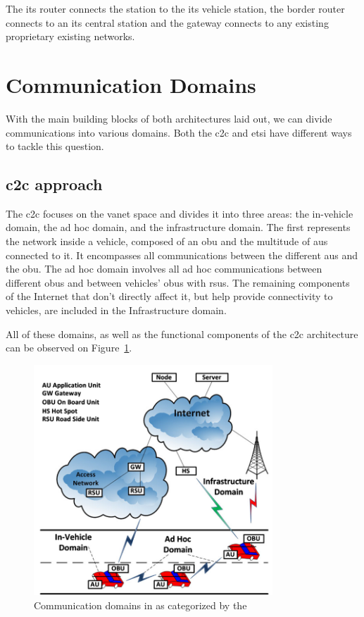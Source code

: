 \begin{enumerate}
The \gls{its} router connects the station to the \gls{its} vehicle station, the border router connects to an \gls{its} central station and the gateway connects to any existing proprietary existing networks.

\end{enumerate}


\section{Communication Domains}
\label{sec:VANET_communication_domains}

With the main building blocks of both architectures laid out, we can divide communications into various domains. Both the \gls{c2c} and \gls{etsi} have different ways to tackle this question.

\subsection[C2C approach]{\gls{c2c} approach}
The \gls{c2c} focuses on the \gls{vanet} space and divides it into three areas: the in-vehicle domain, the ad hoc domain, and the infrastructure domain.
The first represents the network inside a vehicle, composed of an \gls{obu} and the multitude of \glspl{au} connected to it. It encompasses all communications between the different \glspl{au} and the \gls{obu}.
The ad hoc domain involves all ad hoc communications between different \glspl{obu} and between vehicles' \glspl{obu} with \glspl{rsu}.
The remaining components of the Internet that don't directly affect it, but help provide connectivity to vehicles, are included in the Infrastructure domain.

All of these domains, as well as the functional components of the \gls{c2c} architecture can be observed on Figure~\ref{fig:c2c_domain}.

\begin{figure}[htbp]
	\centering
	\includegraphics[width=0.8\textwidth]{Chapters/Figures/VANETs/C2C-CC_domains.png}
	\caption{Communication domains in  as categorized by the ~\cite{al-sultan_comprehensive_2014}}
	\label{fig:c2c_domain}
\end{figure}

